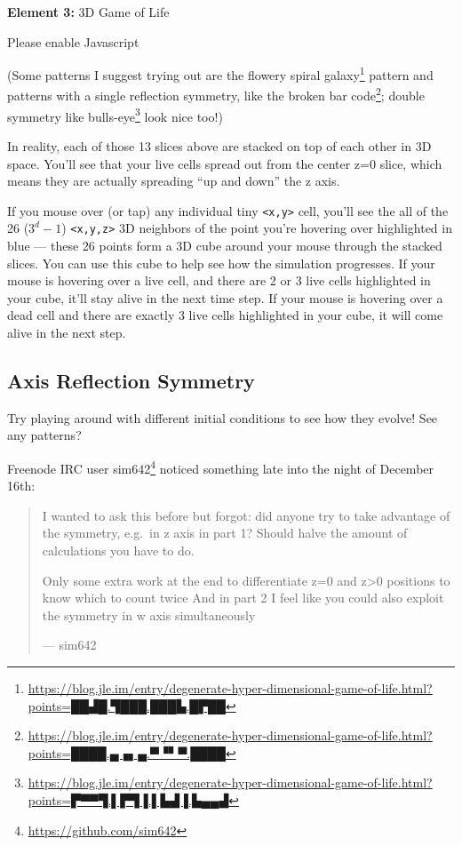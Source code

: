 \documentclass[]{article}
\renewcommand{\href}[2]{#2\footnote{\url{#1}}}
\begin{document}
\leavevmode\hypertarget{gol3D}{}%
\textbf{Element 3:} 3D Game of Life

\leavevmode\hypertarget{gol3DCont}{}%
Please enable Javascript

(Some patterns I suggest trying out are the flowery
\href{https://blog.jle.im/entry/degenerate-hyper-dimensional-game-of-life.html?points=██▟█.▜███.███▙.█▛██}{spiral
galaxy} pattern and patterns with a single reflection symmetry, like the
\href{https://blog.jle.im/entry/degenerate-hyper-dimensional-game-of-life.html?points=████.▄▗▖▄.▀▝▘▀.████}{broken
bar code}; double symmetry like
\href{https://blog.jle.im/entry/degenerate-hyper-dimensional-game-of-life.html?points=▛▀▀▜.▌▛▜▐.▌▙▟▐.▙▄▄▟}{bulls-eye}
look nice too!)

In reality, each of those 13 slices above are stacked on top of each other in 3D
space. You'll see that your live cells spread out from the center z=0 slice,
which means they are actually spreading ``up and down'' the z axis.

If you mouse over (or tap) any individual tiny
\texttt{\textless{}x,y\textgreater{}} cell, you'll see the all of the 26
(\(3^d-1\)) \texttt{\textless{}x,y,z\textgreater{}} 3D neighbors of the point
you're hovering over highlighted in blue --- these 26 points form a 3D cube
around your mouse through the stacked slices. You can use this cube to help see
how the simulation progresses. If your mouse is hovering over a live cell, and
there are 2 or 3 live cells highlighted in your cube, it'll stay alive in the
next time step. If your mouse is hovering over a dead cell and there are exactly
3 live cells highlighted in your cube, it will come alive in the next step.

\hypertarget{axis-reflection-symmetry}{%
\subsection{Axis Reflection Symmetry}\label{axis-reflection-symmetry}}

Try playing around with different initial conditions to see how they evolve! See
any patterns?

Freenode IRC user \href{https://github.com/sim642}{sim642} noticed something
late into the night of December 16th:

\begin{quote}
I wanted to ask this before but forgot: did anyone try to take advantage of the
symmetry, e.g.~in z axis in part 1? Should halve the amount of calculations you
have to do.

Only some extra work at the end to differentiate z=0 and z\textgreater0
positions to know which to count twice And in part 2 I feel like you could also
exploit the symmetry in w axis simultaneously

--- sim642
\end{quote}
\end{document}
